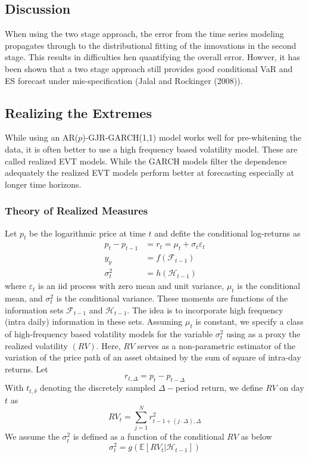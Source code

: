 \documentclass{article}
\theoremstyle{definition}
\theoremstyle{definition}
\def\E{\mathbb{E}}
\def\f{\mathcal{F}}
\begin{document}
\subsection{Discussion}
When using the two stage approach, the error from the time series modeling propagates through to the distributional fitting of the innovations in the second stage. This results in difficulties hen quantifying the overall error. Howver, it has been shown that a two stage approach still provides good conditional VaR and ES forecast under mis-specification (Jalal and Rockinger (2008)).

\subsection{Realizing the Extremes}
While using an AR($p$)-GJR-GARCH(1,1) model works well for pre-whitening the data, it is often better to use a high frequency based volatility model. These are called realized EVT models. While the GARCH models filter the dependence adequately the realized EVT models perform better at forecasting especially at longer time horizons. 
\subsubsection{Theory of Realized Measures}
Let $p_t$ be the logarithmic price at time $t$ and defite the conditional log-returns as
\begin{align*}
    p_t-p_{t-1}&=r_t=\mu_t+\sigma_t\varepsilon_t\\
    y_y&=f(\f_{t-1})\\
    \sigma_t^2&=h(\mathcal{H}_{t-1})
\end{align*}
where $\varepsilon_t$ is an iid process with zero mean and unit variance, $\mu_t$ is the conditional mean, and $\sigma_t^2$ is the conditional variance. These moments are functions of the information sets $\f_{t-1}$ and $\mathcal{H}_{t-1}$. The idea is to incorporate high frequency (intra daily) information in these sets. Assuming $\mu_t$ is constant, we specify a class of high-frequency based volatility models for the variable $\sigma_t^2$ using as a proxy the realized volatility $(RV)$. Here, $RV$ serves as a non-parametric estimator of the variation of the price path of an asset obtained by the sum of square of intra-day returns. Let 
\[r_{t,\Delta}= p_t-p_{t-\Delta}\]
With $t_{t,\delta}$ denoting the discretely sampled $\Delta-$period return, we define $RV$ on day $t$ as 
\[RV_t= \sum_{j=1}^Nr^2_{t-1+(j\cdot \Delta),\Delta}\]
We assume the $\sigma_t^2$ is defined as a function of the conditional $RV$ as below
\[\sigma_t^2=g(\E[RV_t|\mathcal{H}_{t-1}])\]
\end{document}
